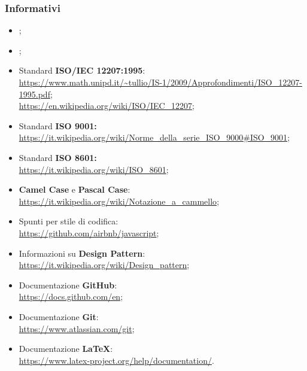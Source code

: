 \subsubsection{Informativi}
\begin{itemize}
\item {};
\item {};
\item Standard \textbf{ISO/IEC 12207:1995}:\\ \url{https://www.math.unipd.it/~tullio/IS-1/2009/Approfondimenti/ISO_12207-1995.pdf};\\
\url{https://en.wikipedia.org/wiki/ISO/IEC_12207};
\item Standard \textbf{ISO 9001: }\\ \url{https://it.wikipedia.org/wiki/Norme_della_serie_ISO_9000#ISO_9001};
\item Standard \textbf{ISO 8601: }\\ \url{https://it.wikipedia.org/wiki/ISO_8601};
\item \textbf{Camel Case} e \textbf{Pascal Case}:\\ \url{https://it.wikipedia.org/wiki/Notazione_a_cammello};
\item Spunti per stile di codifica:\\ \url{https://github.com/airbnb/javascript};
\item Informazioni su \textbf{Design Pattern}:\\ \url{https://it.wikipedia.org/wiki/Design_pattern};
\item Documentazione \textbf{GitHub}:\\ \url{https://docs.github.com/en};
\item Documentazione \textbf{Git}:\\ \url{https://www.atlassian.com/git};
\item Documentazione \textbf{\LaTeX}:\\ \url{https://www.latex-project.org/help/documentation/}.
\end{itemize}
